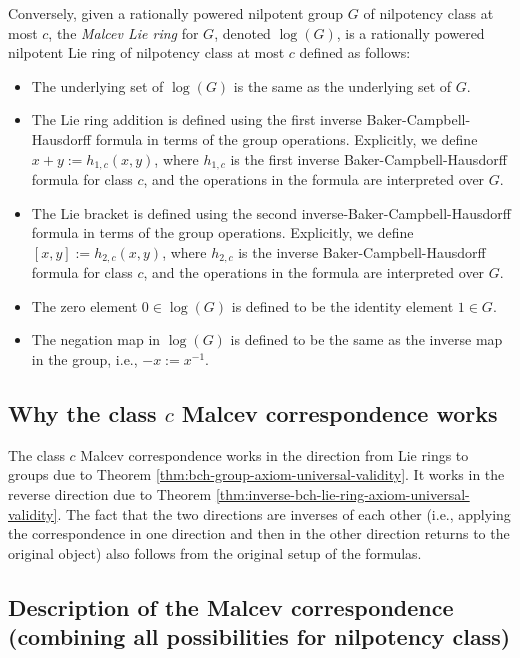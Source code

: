 \documentclass{ucetd}
\begin{document}
Conversely, given a rationally powered nilpotent group $G$ of
nilpotency class at most $c$, the {\em Malcev Lie ring} for $G$,
denoted $\log(G)$, is a rationally powered nilpotent Lie ring of
nilpotency class at most $c$ defined as follows:

\begin{itemize}
\item The underlying set of $\log(G)$ is the same as the underlying
  set of $G$.
\item The Lie ring addition is defined using the first inverse
  Baker-Campbell-Hausdorff formula in terms of the group
  operations. Explicitly, we define $x + y := h_{1,c}(x,y)$, where
  $h_{1,c}$ is the first inverse Baker-Campbell-Hausdorff formula for
  class $c$, and the operations in the formula are interpreted over
  $G$.
\item The Lie bracket is defined using the second
  inverse-Baker-Campbell-Hausdorff formula in terms of the group
  operations. Explicitly, we define $[x,y] := h_{2,c}(x,y)$, where
  $h_{2,c}$ is the inverse Baker-Campbell-Hausdorff formula for class
  $c$, and the operations in the formula are interpreted over $G$.
\item The zero element $0 \in \log(G)$ is defined to be the identity
  element $1 \in G$.
\item The negation map in $\log(G)$ is defined to be the same as the
  inverse map in the group, i.e., $-x := x^{-1}$.
\end{itemize}

\subsection{Why the class $c$ Malcev correspondence works}

The class $c$ Malcev correspondence works in the direction from Lie
rings to groups due to Theorem
\ref{thm:bch-group-axiom-universal-validity}. It works in the reverse
direction due to Theorem
\ref{thm:inverse-bch-lie-ring-axiom-universal-validity}. The fact that
the two directions are inverses of each other (i.e., applying the
correspondence in one direction and then in the other direction
returns to the original object) also follows from the original setup
of the formulas.

\subsection{Description of the Malcev correspondence (combining all possibilities for nilpotency class)}
\end{document}
